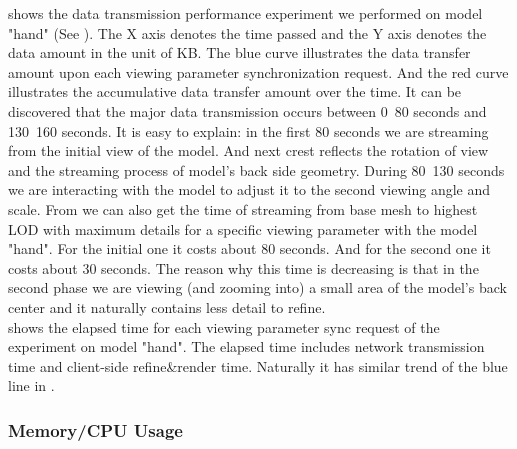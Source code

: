  shows the data transmission performance experiment we performed on model "hand" (See ). The X axis denotes the time passed and the Y axis denotes the data amount in the unit of KB. The blue curve illustrates the data transfer amount upon each viewing parameter synchronization request. And the red curve illustrates the accumulative data transfer amount over the time. It can be discovered that the major data transmission occurs between 0~80 seconds and 130~160 seconds. It is easy to explain: in the first 80 seconds we are streaming from the initial view of the model. And next crest reflects the rotation of view and the streaming process of model's back side geometry. During 80~130 seconds we are interacting with the model to adjust it to the second viewing angle and scale. From  we can also get the time of streaming from base mesh to highest LOD with maximum details for a specific viewing parameter with the model "hand". For the initial one it costs about 80 seconds. And for the second one it costs about 30 seconds. The reason why this time is decreasing is that in the second phase we are viewing (and zooming into) a small area of the model's back center and it naturally contains less detail to refine. \\

 shows the elapsed time for each viewing parameter sync request of the experiment on model "hand". The elapsed time includes network transmission time and client-side refine\&render time. Naturally it has similar trend of the blue line in .





\subsubsection{Memory/CPU Usage}
\label{section:clientmemcpuusage}

